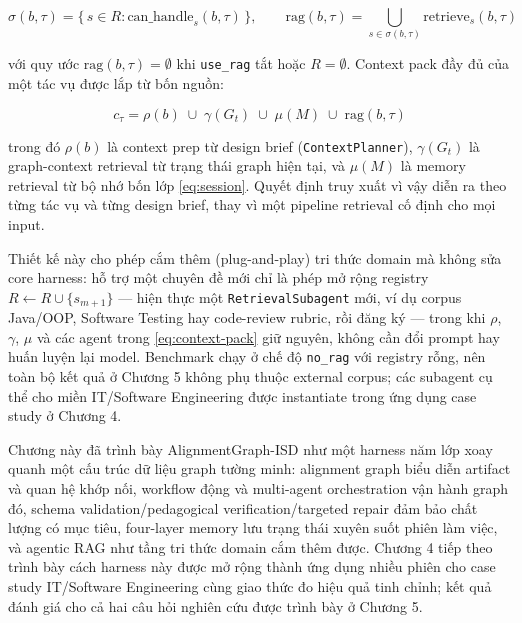 \documentclass[../main.tex]{subfiles}
\begin{document}
\begin{equation}\label{eq:rag-select}
\sigma(b, \tau) = \{\, s \in R : \mathrm{can\_handle}_s(b, \tau) \,\}, \qquad
\mathrm{rag}(b, \tau) = \bigcup_{s \in \sigma(b, \tau)} \mathrm{retrieve}_s(b, \tau)
\end{equation}

với quy ước $\mathrm{rag}(b, \tau) = \emptyset$ khi \texttt{use\_rag} tắt hoặc $R = \emptyset$. Context pack đầy đủ của một tác vụ được lắp từ bốn nguồn:

\begin{equation}\label{eq:context-pack}
c_\tau = \rho(b) \;\cup\; \gamma(G_t) \;\cup\; \mu(M) \;\cup\; \mathrm{rag}(b, \tau)
\end{equation}

trong đó $\rho(b)$ là context prep từ design brief (\texttt{ContextPlanner}), $\gamma(G_t)$ là graph-context retrieval từ trạng thái graph hiện tại, và $\mu(M)$ là memory retrieval từ bộ nhớ bốn lớp \eqref{eq:session}. Quyết định truy xuất vì vậy diễn ra theo từng tác vụ và từng design brief, thay vì một pipeline retrieval cố định cho mọi input.

Thiết kế này cho phép cắm thêm (plug-and-play) tri thức domain mà không sửa core harness: hỗ trợ một chuyên đề mới chỉ là phép mở rộng registry $R \leftarrow R \cup \{s_{m+1}\}$ — hiện thực một \texttt{RetrievalSubagent} mới, ví dụ corpus Java/OOP, Software Testing hay code-review rubric, rồi đăng ký — trong khi $\rho$, $\gamma$, $\mu$ và các agent trong \eqref{eq:context-pack} giữ nguyên, không cần đổi prompt hay huấn luyện lại model. Benchmark chạy ở chế độ \texttt{no\_rag} với registry rỗng, nên toàn bộ kết quả ở Chương 5 không phụ thuộc external corpus; các subagent cụ thể cho miền IT/Software Engineering được instantiate trong ứng dụng case study ở Chương 4.

Chương này đã trình bày AlignmentGraph-ISD như một harness năm lớp xoay quanh một cấu trúc dữ liệu graph tường minh: alignment graph biểu diễn artifact và quan hệ khớp nối, workflow động và multi-agent orchestration vận hành graph đó, schema validation/pedagogical verification/targeted repair đảm bảo chất lượng có mục tiêu, four-layer memory lưu trạng thái xuyên suốt phiên làm việc, và agentic RAG như tầng tri thức domain cắm thêm được. Chương 4 tiếp theo trình bày cách harness này được mở rộng thành ứng dụng nhiều phiên cho case study IT/Software Engineering cùng giao thức đo hiệu quả tinh chỉnh; kết quả đánh giá cho cả hai câu hỏi nghiên cứu được trình bày ở Chương 5.
\end{document}

